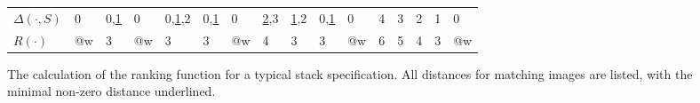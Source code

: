 \begin{figure*}[ht]
\begin{tabular}{|l|p{4mm}p{6mm}p{4mm}p{8mm}p{6mm}p{4mm}p{6mm}p{6mm}p{6mm}%
    p{4mm}p{4mm}p{4mm}p{4mm}p{4mm}p{4mm}|}
    $\Delta(\cdot,S)$ %
    & 0 & 0,\underline{1} & 0 & 0,\underline{1},2 & 0,\underline{1} & 0 & \underline{2},3 & \underline{1},2 & 0,\underline{1} & 0 & 4 & 3 & 2 & 1 & 0 \\
    $R(\cdot)$
    & @w & 3 & @w & 3 & 3 & @w & 4 & 3 & 3 & @w & 6 & 5 & 4 & 3 & @w \\
    \hline
  \end{tabular}
  \caption{The calculation of the ranking function for
    a typical stack specification. %
    All distances for 
    matching images are listed, with the minimal non-zero distance underlined.}
  \label{fig:client:dist}
  \vspace{-3eX}
\end{figure*}
